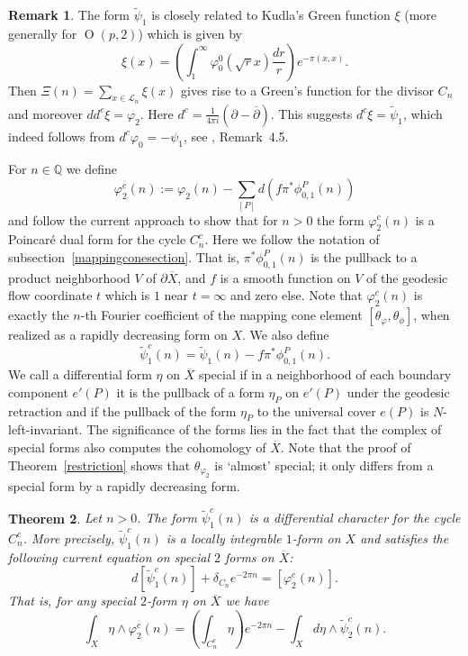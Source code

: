 \documentclass[12pt,leqno]{amsart}
\numberwithin{equation}{section}
\theoremstyle{plain}
\newtheorem{theorem}{Theorem}[section]
\theoremstyle{definition}
\newtheorem{remark}[theorem]{Remark}
\theoremstyle{remark}
\newcommand{\Q}{\mathbb{Q}}
\newcommand{\calL}{\mathcal{L}}
\newcommand{\Orth}{\operatorname{O}}
\begin{document}
\begin{remark}\label{Kudla-xi}
The form $\tilde{\psi}_1$ is closely related to Kudla's Green function $\xi$ \cite{KAnn97,KBforms} (more generally for $\Orth(p,2)$) which is given by 
\[
\xi(x) =   \left( \int_1^{\infty} \varphi_0^0(\sqrt{r}x)  \frac{dr}{r} \right) e^{- \pi (x,x) }.
\]
Then $\Xi(n) = \sum_{x\in\calL_n} \xi(x)$ gives rise to a Green's function for the divisor $C_n$ and moreover $dd^c \xi = \varphi_2$. Here $d^c = \tfrac{1}{4\pi i}(\partial - \overline{\partial})$. This suggests $d^c \xi = \tilde{\psi}_1$, which indeed follows from $d^c \varphi_0 = -\psi_1$, see \cite{BFDuke}, Remark~4.5. 
\end{remark}

For $n \in \Q$ we define
\[
 \varphi_2^c(n) :=  \varphi_2(n) - \sum_{[P]} d(f \pi^{\ast} \phi^P_{0,1}(n))
\]
and follow the current approach to show that for $n>0$ the form $\varphi_2^c(n)$
is a Poincar\'e dual form for the cycle $C_n^c$. Here we follow the notation of subsection~\ref{mappingconesection}. That is, $\pi^{\ast} \phi^P_{0,1}(n)$ is the pullback to a product neighborhood $V$ of $\partial \overline{X}$, and $f$ is a smooth function on $V$ of the geodesic flow coordinate $t$ which is $1$ near $t=\infty$ and zero else. Note that  $\varphi_2^c(n)$ is exactly the $n$-th Fourier coefficient of the mapping cone element $[\theta_{\varphi},\theta_{\phi}]$, when realized as a rapidly decreasing form on $X$. We also define 
\[
\tilde{\psi}_1^c(n) = \tilde{\psi}_1(n) - f \pi^{\ast} \phi^P_{0,1}(n). 
\]
We call a differential form $\eta$ on $\overline{X}$ special if in a neighborhood of each boundary component $e'(P)$ it is the pullback of a form $\eta_P$ on $e'(P)$ under the geodesic retraction and if the pullback of the form $\eta_P$ to the universal cover $e(P)$ is $N$-left-invariant. The significance of the forms lies in the fact that the complex of special forms also computes the cohomology of $\overline{X}$. Note that the proof of Theorem~\ref{restriction} shows that $\theta_{\varphi_2}$ is `almost' special; it only differs from a special form by a rapidly decreasing form. 




\begin{theorem}\label{newcurrenteq}
Let $n>0$. The form $ \tilde{\psi}_1^c(n)$ is a differential character for the cycle $C^c_n$. More precisely, $\tilde{\psi}_1^c(n)$ is a locally integrable $1$-form on $X$ and satisfies the following current equation on special $2$ forms on $\overline{X}$:
\[
d[\tilde{\psi}_1^c(n)] + \delta_{C_n}  e^{-2\pi n} = [\varphi_2^c(n)].
\]
That is, for any special $2$-form $\eta$ on $\overline{X}$ we have 
\[
\int_{X} \eta \wedge \varphi^c_{2}(n)  = \left(\int_{C^c_n}  \eta \right) e^{-2 \pi n} - \int_{X}  d\eta \wedge \tilde{\psi}^c_{2}(n).
\]
\end{theorem}
\end{document}
